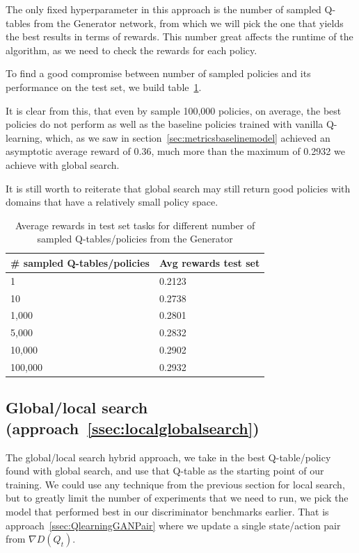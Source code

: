 The only fixed hyperparameter in this approach is the number of sampled Q-tables from the Generator network, from which we will pick the one that yields the best results in terms of rewards. This number great affects the runtime of the algorithm, as we need to check the rewards for each policy.

To find a good compromise between number of sampled policies and its performance on the test set, we build table~\ref{tab:avgrewardsglobalsearch}.

It is clear from this, that even by sample 100,000 policies, on average, the best policies do not perform as well as the baseline policies trained with vanilla Q-learning, which, as we saw in section~\ref{sec:metricsbaselinemodel} achieved an asymptotic average reward of 0.36, much more than the maximum of 0.2932 we achieve with global search.

It is still worth to reiterate that global search may still return good policies with domains that have a relatively small policy space.

\begin{table}[H]
\centering
\begin{tabular}{@{}ll@{}}
\toprule
\# sampled Q-tables/policies & Avg rewards test set \\ \midrule
1                            & 0.2123               \\
10                           & 0.2738               \\
1,000                        & 0.2801               \\
5,000                        & 0.2832               \\
10,000                       & 0.2902               \\
100,000                      & 0.2932               \\ \bottomrule
\end{tabular}
\caption{Average rewards in test set tasks for different number of sampled Q-tables/policies from the Generator}
\label{tab:avgrewardsglobalsearch}
\end{table}

\subsection{Global/local search (approach~\ref{ssec:localglobalsearch})}
The global/local search hybrid approach, we take in the best Q-table/policy found with global search, and use that Q-table as the starting point of our training.  We could use any technique from the previous section for local search, but to greatly limit the number of experiments that we need to run, we pick the model that performed best in our discriminator benchmarks earlier. That is approach~\ref{ssec:QlearningGANPair} where we update a single state/action pair from $\nabla D(Q_{t})$.


